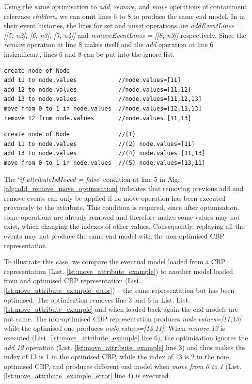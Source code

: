 \documentclass{llncs}
\begin{document}
Using the same optimisation to \emph{add}, \emph{remove}, and \emph{move} operations of containment reference \emph{children}, we can omit lines 6 to 8 to produce the same end model. In in their event histories, the lines for set and unset operations are \emph{addEventLines = [[5, n2], [6, n3], [7, n4]]} and \emph{removeEventLines = [[8, n3]]} respectively. Since the \emph{remove} operation at line 8 makes itself and the \emph{add} operation at line 6 insignificant, lines 6 and 8 can be put into the ignore list.

\begin{lstlisting}[style=eol,caption={Example of CBP representation of attribute \emph{values}'s move operations.},label=lst:move_attribute_example]
create node of Node
add 11 to node.values            //node.values=[11] 
add 12 to node.values            //node.values=[11,12] 
add 13 to node.values            //node.values=[11,12,13] 
move from 0 to 1 in node.values  //node.values=[12,11,13]  
remove 12 from node.values       //node.values=[11,13] 
\end{lstlisting}

\begin{lstlisting}[style=eol,caption={Example of optimised CBP representation of attribute \emph{values}'s move operations.},label=lst:move_attribute_example_error]
create node of Node              //(1)  
add 11 to node.values            //(2) node.values=[11] 
add 13 to node.values            //(4) node.values=[11,13] 
move from 0 to 1 in node.values  //(5) node.values=[13,11]   
\end{lstlisting}

The `\emph{if attributeIsMoved = false}' condition at line 5 in Alg. \ref{alg:add_remove_move_optimisation} indicates that removing previous add and remove events can only be applied if no move operation has been executed previously to the attribute. This condition is required, since after optimisation, some operations are already removed and therefore makes some values may not exist, which changing the indexes of other values. Consequently, replaying all the events may not produce the same end model with the non-optimised CBP representation. 

To illustrate this case, we compare the eventual model loaded from a CBP representation (List. \ref{lst:move_attribute_example}) to another model loaded from and optimised CBP representation (List. \ref{lst:move_attribute_example_error}) -- the same representation but has been optimised. The optimisation removes line 3 and 6 in List. List. \ref{lst:move_attribute_example} and when loaded back again the end models are not same. The non-optimised CBP representation produces \emph{node.values=[11,13]} while the optimised one produces \emph{node.values=[13,11]}. When \emph{remove 12} is executed (List. \ref{lst:move_attribute_example} line 6), the optimisation ignores the \emph{add 12} operation (List. \ref{lst:move_attribute_example} line 3) and thus makes the index of 13 is 1 in the optimised CBP, while the index of 13 is 2 in the non-optimised CBP, and produces different end model when \emph{move from 0 to 1} (List. \ref{lst:move_attribute_example_error} line 4) is executed. 
\end{document}
